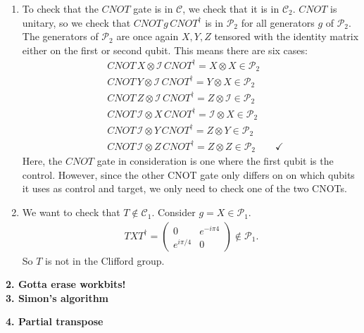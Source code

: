 \documentclass{article}
\theoremstyle{definition}
\newcommand{\Id}{\mathcal{I}}
\begin{document}
\begin{enumerate}[label=(\alph*)]
	\item To check that the $CNOT$ gate is in $\mathcal{C}$, we check that it is in $\mathcal{C}_2$. $CNOT$ is unitary, so we check that $CNOT \, g \, CNOT^\dagger$ is in $\mathcal{P}_2$ for all generators $g$ of $\mathcal{P}_2$. The generators of $\mathcal{P}_2$ are once again $X,Y,Z$ tensored with the identity matrix either on the first or second qubit. This means there are six cases:
	 \begin{align*}
	 	&CNOT\,X \otimes \Id \,CNOT^\dagger = X\otimes X \in \mathcal{P}_2 \\
	 	&CNOT\,Y \otimes \Id \,CNOT^\dagger = Y\otimes X \in \mathcal{P}_2 \\
	 	&CNOT\,Z \otimes \Id \,CNOT^\dagger = Z\otimes \Id \in \mathcal{P}_2 \\
	 	&CNOT\,\Id \otimes X \,CNOT^\dagger = \Id \otimes X \in \mathcal{P}_2 \\
	 	&CNOT\,\Id \otimes Y \,CNOT^\dagger = Z \otimes Y \in \mathcal{P}_2 \\
	 	&CNOT\,\Id \otimes Z \,CNOT^\dagger = Z \otimes Z \in \mathcal{P}_2 \quad\quad \checkmark
	 \end{align*}
 	Here, the $CNOT$ gate in consideration is one where the first qubit is the control. However, since the other CNOT gate only differs on on which qubits it uses as control and target, we only need to check one of the two CNOTs.
	
	\item We want to check that $T\notin \mathcal{C}_1$. Consider $g = X\in \mathcal{P}_1$. 
	\begin{align*}
		TXT^\dagger = \begin{pmatrix}
			0 & e^{-i\pi4} \\ e^{i\pi/4} & 0
		\end{pmatrix} \notin \mathcal{P}_1.
	\end{align*}
	So $T$ is not in the Clifford group.
\end{enumerate}



\noindent \textbf{2. Gotta erase workbits!}\\




\noindent \textbf{3. Simon's algorithm}


\noindent \textbf{4. Partial transpose}
\end{document}
